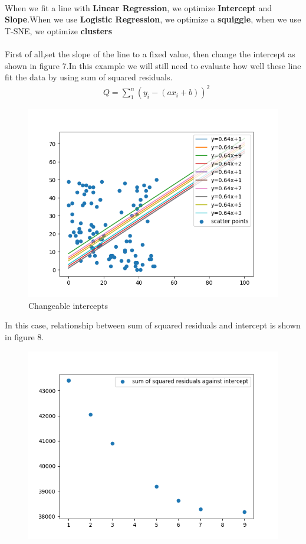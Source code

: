 \documentclass[a4paper,12pt]{article}
\begin{document}
\begin{spacing}{2}
\paragraph{ }When we fit a line with \textbf{Linear Regression}, we optimize \textbf{Intercept} and \textbf{Slope}.When we use \textbf{Logistic Regression}, we optimize a \textbf{squiggle}, when we use T-SNE, we optimize \textbf{clusters}
\paragraph{ }First of all,set the slope of the line to a fixed value, then change the intercept as shown in figure 7.In this example we will still need to evaluate how well these line fit the data by using sum of squared residuals.
\begin{align}
&Q=\sum_{1}^n(y_{i}-(ax_{i}+b))^{2}
\end{align}
\newpage
\begin{figure}
\centering
\includegraphics[scale=0.5]{Figure_7.png}
\caption{Changeable intercepts}
\label{Changeable intecepts}
\end{figure}
In this case, relationship between sum of squared residuals and intercept is shown in figure 8. 
\begin{figure}[h]
\centering
\includegraphics[scale=0.5]{Figure_8.png}

\end{figure}
\end{spacing}
\end{document}

